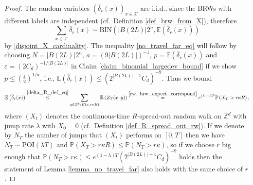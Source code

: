 \documentclass[a4paper,12pt]{article}
\begin{document}
\begin{proof}
 The random variables $\left(\overline{\delta}_r(x) \right)_{x \in \mathcal{X}}$ are i.i.d., since the BRWs with different labels are independent (cf.\ Definition \ref{def_brw_from_X}), therefore
 $$
 \sum_{x \in \mathcal{X} } \overline{\delta}_r(x) \sim \mathrm{BIN}\left( |B(2L)| 2^n, \mathbb{E}\left( \overline{\delta}_r(x) \right)  \right)
 $$
 by \eqref{disjoint_X_cardinality}.
The inequality \eqref{no_travel_far_eq} will follow by choosing
$N= |B(2L)| 2^n $, $a=(9 |B(2L)|)^{-1}$, $p=\mathbb{E}\left( \overline{\delta}_r(x) \right)$ and $\varepsilon=(2 C_d)^{-1/|B(2L)|}$  in Claim \ref{claim_binomial_largedev_bound} if we show $p \leq \left( \frac{\varepsilon}{2} \right)^{1/a}$, i.e.,
$\mathbb{E}\left( \overline{\delta}_r(x) \right) \leq  \left( 2^{|B(2L)|+1} C_d \right)^{-9}$. Thus we bound
\begin{equation}\label{brw_rw_expect}
  \mathbb{E}\left( \overline{\delta}_r(x) \right)\stackrel{ \eqref{delta_R_def_eq} }{ \leq } \sum_{y \in \mathbb{Z}^d \setminus B(x,r\kappa R)} \mathbb{E}\left( Z_T(x,y) \right)
  \stackrel{ \eqref{rw_brw_expect_correspond} }{=} e^{(\lambda-1)T} \mathbb{P}\left( X_T > r\kappa R \right),
\end{equation}
where $(X_t)$ denotes the continuous-time $R$-spread-out random walk on $\mathbb{Z}^d$ with jump rate $\lambda$ with $X_0= 0$ (cf.\ Definition \ref{def_R_spread_out_rw}).
If we denote by $N_T$ the number of jumps that $(X_t)$ performs on $[0,T]$ then we have $N_T \sim \mathrm{POI}(\lambda T) $ and $\mathbb{P}\left( X_T > r\kappa R \right)\leq \mathbb{P}\left( N_T > r \kappa \right) $, so if we choose $r$ big enough that
$\mathbb{P}\left( N_T > r \kappa \right) \leq  e^{(1-\lambda)T} \left( 2^{|B(2L)|+1} C_d \right)^{-9}$ holds then the statement of Lemma \ref{lemma_no_travel_far} also holds with the same choice of $r$.
\end{proof}
\end{document}
